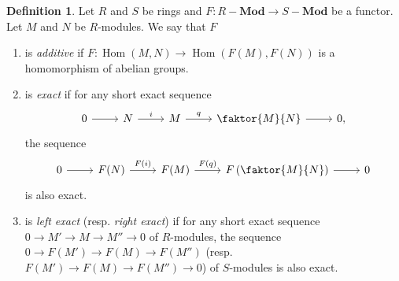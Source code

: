 \documentclass[10pt,letterpaper,cm]{nupset}
\theoremstyle{definition}
\newtheorem{definition}{Definition}[subsection]
\theoremstyle{theorem}
\theoremstyle{remark}
\newcommand{\1}{\mathbf{1}}
\newcommand{\0}{\vec 0}
\DeclareMathOperator{\Hom}{Hom}
\begin{document}
\begin{definition} Let $R$ and $S$ be rings and $F: R{-} \mathbf{Mod} \to S{-}\mathbf{Mod}$ be a functor. Let $M$ and $N$ be $R$-modules. We say that $F$
\begin{enumerate}
\item is \textit{additive} if $F : \Hom(M, N) \to \Hom(F(M), F(N))$ is a homomorphism of abelian groups.
\item is \textit{exact} if for any short exact sequence 
\[
\begin{tikzcd}
0 \arrow[r] & N \arrow[r, "i"] & M \arrow[r, "q"] & \faktor{M}{N} \arrow[r] & 0
,\end{tikzcd}
\]
the sequence
\[
\begin{tikzcd}
0 \arrow[r] & F(N) \arrow[r, "F(i)"] & F(M) \arrow[r, "F(q)"] & F\left(\faktor{M}{N}\right) \arrow[r] & 0
\end{tikzcd}
\] is also exact.
\item is \textit{left exact} (resp. \textit{right exact}) if for any short exact sequence $0 \to M' \to M \to M'' \to 0$ of $R$-modules, the sequence $0 \to F(M') \to F(M) \to F(M'')$ (resp. $F(M') \to F(M) \to F(M'') \to 0$) of $S$-modules is also exact.
\end{enumerate}
\end{definition}
\end{document}
